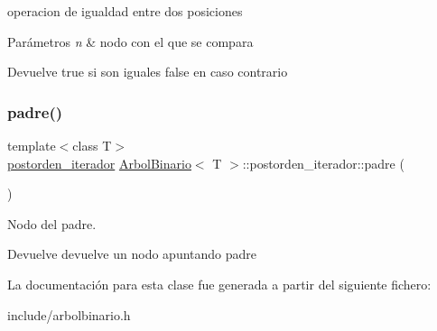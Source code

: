 operacion de igualdad entre dos posiciones 


\begin{DoxyParams}{Parámetros}
{\em n} & nodo con el que se compara \\
\hline
\end{DoxyParams}
\begin{DoxyReturn}{Devuelve}
true si son iguales false en caso contrario 
\end{DoxyReturn}
\mbox{\label{classArbolBinario_1_1postorden__iterador_a7893b03a1cf0ab8b58ecf3bdb24dcc4c}} 
\subsubsection{\texorpdfstring{padre()}{padre()}}
{\footnotesize\ttfamily template$<$class T$>$ \\
\hyperlink{classArbolBinario_1_1postorden__iterador}{postorden\+\_\+iterador} \hyperlink{classArbolBinario}{Arbol\+Binario}$<$ T $>$\+::postorden\+\_\+iterador\+::padre (\begin{DoxyParamCaption}{ }\end{DoxyParamCaption})\hspace{0.3cm}{\ttfamily [inline]}}



Nodo del padre. 

\begin{DoxyReturn}{Devuelve}
devuelve un nodo apuntando padre 
\end{DoxyReturn}


La documentación para esta clase fue generada a partir del siguiente fichero\+:\begin{DoxyCompactItemize}
\item 
include/arbolbinario.\+h\end{DoxyCompactItemize}

